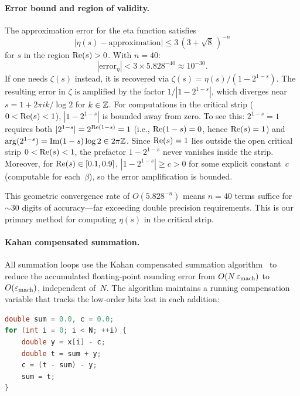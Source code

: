 \paragraph{Error bound and region of validity.}
The approximation error for the eta function satisfies~\cite{borwein2000}
\begin{equation}\label{eq:borwein-error}
  |\eta(s) - \text{approximation}| \le 3\,(3 + \sqrt{8}\,)^{-n}
\end{equation}
for $s$ in the region $\operatorname{Re}(s) > 0$. With $n = 40$:
\begin{equation}\label{eq:borwein-40}
  |\text{error}_\eta| < 3 \times 5.828^{-40} \approx 10^{-30}.
\end{equation}
If one needs $\zeta(s)$ instead, it is recovered via $\zeta(s) = \eta(s)/(1 - 2^{1-s})$.
The resulting error in $\zeta$ is amplified by the factor $1/|1 - 2^{1-s}|$, which
diverges near $s = 1 + 2\pi ik/\log 2$ for $k \in \mathbb{Z}$. For computations in the critical
strip ($0 < \operatorname{Re}(s) < 1$), $|1 - 2^{1-s}|$ is bounded away from zero. To see this:
$2^{1-s} = 1$ requires both $|2^{1-s}| = 2^{\operatorname{Re}(1-s)} = 1$ (i.e., $\operatorname{Re}(1-s) = 0$,
hence $\operatorname{Re}(s) = 1$) and $\arg(2^{1-s}) = \operatorname{Im}(1-s)\log 2 \in 2\pi\mathbb{Z}$. Since $\operatorname{Re}(s) = 1$
lies outside the open critical strip $0 < \operatorname{Re}(s) < 1$, the prefactor $1 - 2^{1-s}$ never
vanishes inside the strip. Moreover, for $\operatorname{Re}(s) \in [0.1, 0.9]$,
$|1 - 2^{1-s}| \ge c > 0$ for some explicit constant~$c$ (computable for each~$\beta$),
so the error amplification is bounded.

This geometric convergence rate of $O(5.828^{-n})$ means $n = 40$ terms suffice for
$\sim 30$ digits of accuracy---far exceeding double precision requirements. This is our
primary method for computing $\eta(s)$ in the critical strip.

\paragraph{Kahan compensated summation.}
All summation loops use the Kahan compensated summation algorithm~\cite{kahan1965} to
reduce the accumulated floating-point rounding error from $O(N\,\varepsilon_{\mathrm{mach}})$
to $O(\varepsilon_{\mathrm{mach}})$, independent of~$N$. The algorithm maintains a running
compensation variable that tracks the low-order bits lost in each addition:
\begin{lstlisting}[language=C++,caption={Kahan compensated summation.}]
double sum = 0.0, c = 0.0;
for (int i = 0; i < N; ++i) {
    double y = x[i] - c;
    double t = sum + y;
    c = (t - sum) - y;
    sum = t;
}
\end{lstlisting}

